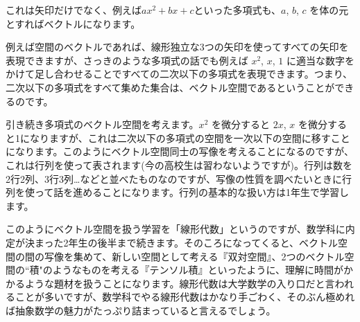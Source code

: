 これは矢印だけでなく、例えば$ax^2 + bx + c$といった多項式も、$a$, $b$, $c$ を体の元とすればベクトルになります。

例えば空間のベクトルであれば、線形独立な3つの矢印を使ってすべての矢印を表現できますが、さっきのような多項式の話でも例えば $x^2$, $x$, $1$ に適当な数字をかけて足し合わせることですべての二次以下の多項式を表現できます。つまり、二次以下の多項式をすべて集めた集合は、ベクトル空間であるということができるのです。

引き続き多項式のベクトル空間を考えます。$x^2$ を微分すると $2x$, $x$ を微分すると1になりますが、これは二次以下の多項式の空間を一次以下の空間に移すことになります。このようにベクトル空間同士の写像を考えることになるのですが、これは行列を使って表されます(今の高校生は習わないようですが)。行列は数を2行2列、3行3列…などと並べたものなのですが、写像の性質を調べたいときに行列を使って話を進めることになります。行列の基本的な扱い方は1年生で学習します。

このようにベクトル空間を扱う学習を「線形代数」というのですが、数学科に内定が決まった2年生の後半まで続きます。そのころになってくると、ベクトル空間の間の写像を集めて、新しい空間として考える『双対空間』、2つのベクトル空間の``積"のようなものを考える『テンソル積』といったように、理解に時間がかかるような題材を扱うことになります。線形代数は大学数学の入り口だと言われることが多いですが、数学科でやる線形代数はかなり手ごわく、そのぶん極めれば抽象数学の魅力がたっぷり詰まっていると言えるでしょう。
